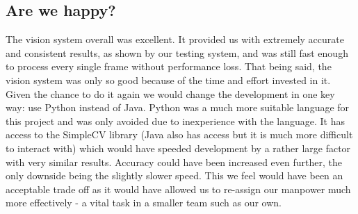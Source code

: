 \subsection{Are we happy?}

The vision system overall was excellent. It provided us with extremely accurate and consistent results, as shown by our testing system, and was still fast enough to process every single frame without performance loss. That being said, the vision system was only so good because of the time and effort invested in it. Given the chance to do it again we would change the development in one key way: use Python instead of Java. Python was a much more suitable language for this project and was only avoided due to inexperience with the language. It has access to the SimpleCV library (Java also has access but it is much more difficult to interact with) which would have speeded development by a rather large factor with very similar results. Accuracy could have been increased even further, the only downside being the slightly slower speed. This we feel would have been an acceptable trade off as it would have allowed us to re-assign our manpower much more effectively - a vital task in a smaller team such as our own.





